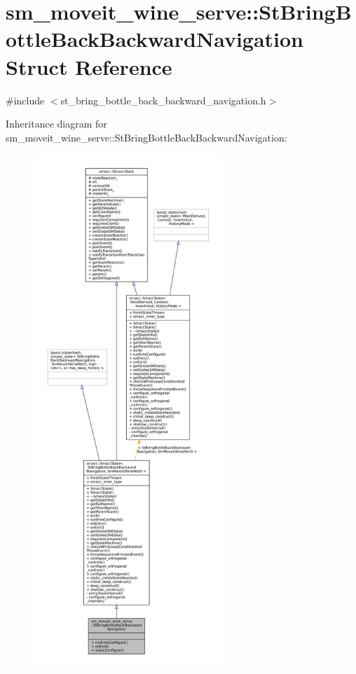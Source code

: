 \hypertarget{structsm__moveit__wine__serve_1_1StBringBottleBackBackwardNavigation}{}\section{sm\+\_\+moveit\+\_\+wine\+\_\+serve\+:\+:St\+Bring\+Bottle\+Back\+Backward\+Navigation Struct Reference}
\label{structsm__moveit__wine__serve_1_1StBringBottleBackBackwardNavigation}


{\ttfamily \#include $<$st\+\_\+bring\+\_\+bottle\+\_\+back\+\_\+backward\+\_\+navigation.\+h$>$}



Inheritance diagram for sm\+\_\+moveit\+\_\+wine\+\_\+serve\+:\+:St\+Bring\+Bottle\+Back\+Backward\+Navigation\+:
\nopagebreak
\begin{figure}[H]
\begin{center}
\leavevmode
\includegraphics[height=550pt]{structsm__moveit__wine__serve_1_1StBringBottleBackBackwardNavigation__inherit__graph}
\end{center}
\end{figure}


